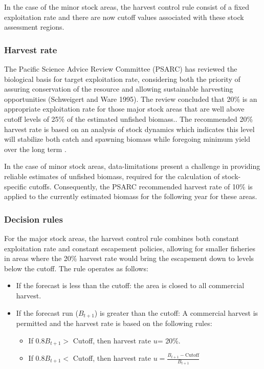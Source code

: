 In the case of the minor stock areas, the harvest control rule consist of a fixed exploitation rate and there are now cutoff values associated with these stock assessment regions.



\subsubsection{Harvest rate} %
\label{ssub:harvest_rate}
	The Pacific Science Advice Review Committee (PSARC) has reviewed the biological basis for target exploitation rate, considering both the priority of assuring conservation of the resource and allowing sustainable harvesting opportunities (Schweigert and Ware 1995). The review concluded that 20\% is an appropriate exploitation rate for those major stock areas that are well above cutoff levels of 25\% of the estimated unfished biomass.. The recommended 20\% harvest rate is based on an analysis of stock dynamics which indicates this level will stabilize both catch and spawning biomass while foregoing minimum yield over the long term \citep{hall1988alternative,zheng1993evaluation}.
	
In the case of minor stock areas, data-limitations present a challenge in providing reliable estimates of unfished biomass, required for the calculation of stock-specific cutoffs. Consequently, the PSARC recommended harvest rate of 10\% is applied to the currently estimated biomass for the following year for these areas.


\subsubsection{Decision rules} %
\label{ssub:decision_rules}
For the major stock areas, the harvest control rule combines both constant exploitation rate and constant escapement policies, allowing for smaller fisheries in areas where the 20\% harvest rate would bring the escapement down to levels below the cutoff. The rule operates as follows:

\begin{itemize}
	\item If the forecast is less than the cutoff: the area is closed to all commercial harvest.
	\item If the forecast run ($B_{t+1}$) is greater than the cutoff: A commercial harvest is permitted and the harvest rate is based on the following rules:
	\begin{itemize}
		\item If $0.8B_{t+1} >$ Cutoff, then harvest rate $u$= 20\%.
		\item If $0.8B_{t+1} <$ Cutoff, then harvest rate $u = \frac{B_{t+1}-\mbox{Cutoff}}{B_{t+1}}$
	\end{itemize}
\end{itemize}

